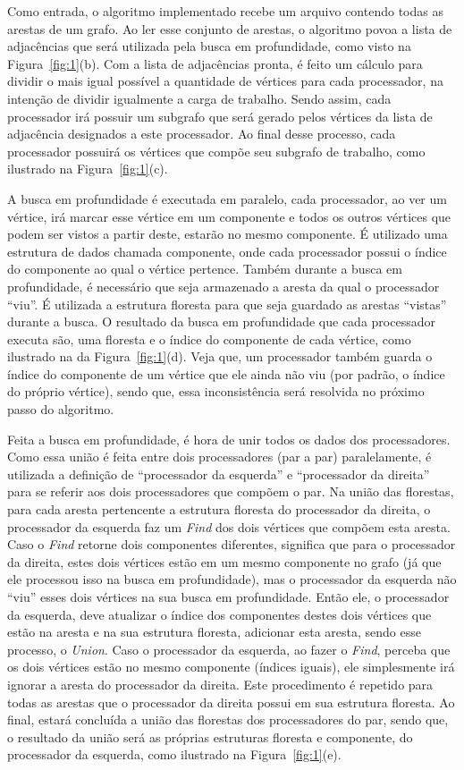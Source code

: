 \documentclass[12pt]{article}
\begin{document}
Como entrada, o algoritmo implementado recebe um arquivo contendo todas as arestas de um grafo. Ao ler esse conjunto de arestas, o algoritmo povoa a lista de adjacências que será utilizada pela busca em profundidade, como visto na Figura~\ref{fig:1}(b). Com a lista de adjacências pronta, é feito um cálculo para dividir o mais igual possível a quantidade de vértices para cada processador, na intenção de dividir igualmente a carga de trabalho. Sendo assim, cada processador irá possuir um subgrafo que será gerado pelos vértices da lista de adjacência designados a este processador. Ao final desse processo, cada processador possuirá os vértices que compõe seu subgrafo de trabalho, como ilustrado na Figura~\ref{fig:1}(c).

A busca em profundidade é executada em paralelo, cada processador, ao ver um vértice, irá marcar esse vértice em um componente e todos os outros vértices que podem ser vistos a partir deste, estarão no mesmo componente. É utilizado uma estrutura de dados chamada componente, onde cada processador possui o índice do componente ao qual o vértice pertence. Também durante a busca em profundidade, é necessário que seja armazenado a aresta da qual o processador “viu”. É utilizada a estrutura floresta para que seja guardado as arestas “vistas” durante a busca. O resultado da busca em profundidade que cada processador executa são, uma floresta e o índice do componente de cada vértice, como ilustrado na da Figura~\ref{fig:1}(d). Veja que, um processador também guarda o índice do componente de um vértice que ele ainda não viu (por padrão, o índice do próprio vértice), sendo que, essa inconsistência será resolvida no próximo passo do algoritmo.

Feita a busca em profundidade, é hora de unir todos os dados dos processadores. Como essa união é feita entre dois processadores (par a par) paralelamente, é utilizada a definição de “processador da esquerda” e “processador da direita” para se referir aos dois processadores que compõem o par. Na união das florestas, para cada aresta pertencente a estrutura floresta do processador da direita, o processador da esquerda faz um \emph{Find} dos dois vértices que compõem esta aresta. Caso o \emph{Find} retorne dois componentes diferentes, significa que para o processador da direita, estes dois vértices estão em um mesmo componente no grafo (já que ele processou isso na busca em profundidade), mas o processador da esquerda não “viu” esses dois vértices na sua busca em profundidade. Então ele, o processador da esquerda, deve atualizar o índice dos componentes destes dois vértices que estão na aresta e na sua estrutura floresta, adicionar esta aresta, sendo esse processo, o \emph{Union}. Caso o processador da esquerda, ao fazer o \emph{Find}, perceba que os dois vértices estão no mesmo componente (índices iguais), ele simplesmente irá ignorar a aresta do processador da direita. Este procedimento é repetido para todas as arestas que o processador da direita possui em sua estrutura floresta. Ao final, estará concluída a união das florestas dos processadores do par, sendo que, o resultado da união será as próprias estruturas floresta e componente, do processador da esquerda, como ilustrado na Figura~\ref{fig:1}(e).
\end{document}
